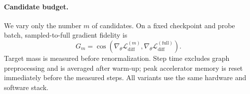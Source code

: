 \paragraph{Candidate budget.}
We vary only the number $m$ of candidates. On a fixed checkpoint and probe
batch, sampled-to-full gradient fidelity is
\begin{equation}
\label{eq:gradient-fidelity}
G_m=\cos\!\left(
\nabla_\theta\mathcal L_{\mathrm{diff}}^{(m)},
\nabla_\theta\mathcal L_{\mathrm{diff}}^{(\mathrm{full})}
\right).
\end{equation}
Target mass is measured before renormalization. Step time excludes graph
preprocessing and is averaged after warm-up; peak accelerator memory is reset
immediately before the measured steps. All variants use the same hardware and
software stack.
